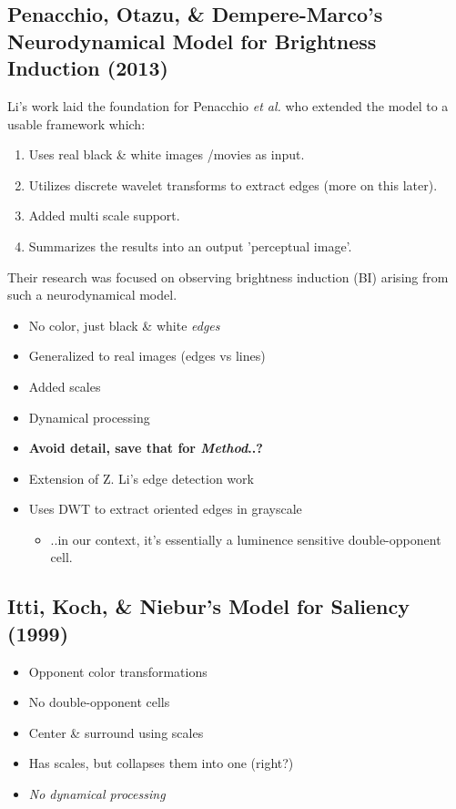 \documentclass[journal,onecolumn]{IEEEtran}
\begin{document}
\subsection*{Penacchio, Otazu, \& Dempere-Marco's Neurodynamical Model for Brightness Induction (2013)}
Li's work laid the foundation for Penacchio \textit{et al.} who extended the model to a usable framework which:
\begin{enumerate}
    \item Uses real black \& white images /movies as input.
    \item Utilizes discrete wavelet transforms to extract edges (more on this later).
    \item Added multi scale support.
    \item Summarizes the results into an output 'perceptual image'.
\end{enumerate}
Their research was focused on observing brightness induction (BI) arising from such a neurodynamical model.
\begin{itemize}
    \item No color, just black \& white \textit{edges}
    \item Generalized to real images (edges vs lines)
    \item Added scales
    \item Dynamical processing
    \item \textbf{Avoid detail, save that for \textit{Method}..?}
    \item Extension of Z. Li's edge detection work
    \item Uses DWT to extract oriented edges in grayscale
    \begin{itemize}
        \item ..in our context, it's essentially a luminence sensitive double-opponent cell.
    \end{itemize}
\end{itemize}


\subsection*{Itti, Koch, \& Niebur's Model for Saliency (1999)}
\begin{itemize}
    \item Opponent color transformations
    \item No double-opponent cells
    \item Center \& surround using scales
    \item Has scales, but collapses them into one (right?)
    \item \textit{No dynamical processing}
\end{itemize}
\end{document}
